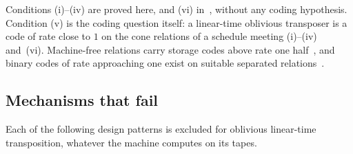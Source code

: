 Conditions (i)--(iv) are proved here, and (vi) in~\cite{SecondPaper2026}, without any coding hypothesis. Condition (v) is the coding
question itself: a linear-time oblivious transposer is a code of rate close to $1$ on the cone relations of a schedule meeting (i)--(iv)
and~(vi). Machine-free relations carry
storage codes above rate one half~\cite{StorageCodes2026}, and binary codes of rate approaching one exist on suitable separated
relations~\cite{HighRate2026}.

\subsection{Mechanisms that fail}

Each of the following design patterns is excluded for oblivious linear-time transposition, whatever the machine computes on
its tapes.
